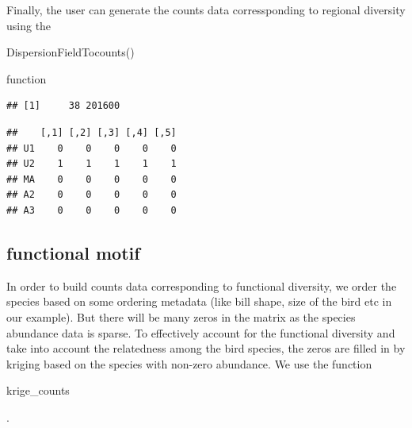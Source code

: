 \documentclass[12pt]{article}
\begin{document}
Finally, the user can generate the counts data corressponding to regional diversity using the \begin{verb} DispersionFieldTocounts() \end{verb} function

\begin{knitrout}
\color{fgcolor}\begin{kframe}
\begin{alltt}
 \hlkwb{<-} 
\end{alltt}
\end{kframe}
\end{knitrout}

\begin{knitrout}
\color{fgcolor}\begin{kframe}
\begin{alltt}
\end{alltt}
\begin{verbatim}
## [1]     38 201600
\end{verbatim}
\begin{alltt}
\hlstd{regional_counts[}\hlopt{:}\hlstd{,}\hlopt{:}\hlstd{]}
\end{alltt}
\begin{verbatim}
##    [,1] [,2] [,3] [,4] [,5]
## U1    0    0    0    0    0
## U2    1    1    1    1    1
## MA    0    0    0    0    0
## A2    0    0    0    0    0
## A3    0    0    0    0    0
\end{verbatim}
\end{kframe}
\end{knitrout}


\subsection{functional motif}

In order to build counts data corresponding to functional diversity, we order the species based on some ordering metadata (like bill shape, size of the bird etc in our example). But there will be many zeros in the matrix as the species abundance data is sparse. To effectively account for the functional diversity and take into account the relatedness among the bird species, the zeros are filled in by kriging based on the species with non-zero abundance. We use the function \begin{verb} krige_counts \end{verb}.
\end{document}
